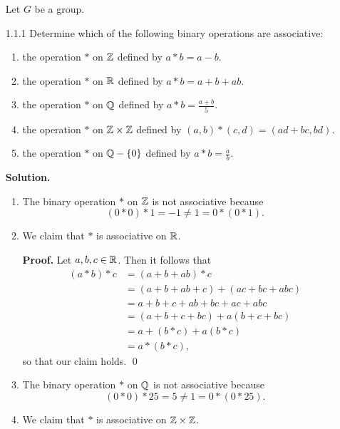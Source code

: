 \begin{enumerate}
   \item[]        Let $G$ be a group.
   \item[1.1.1]   Determine which of the following binary operations are
                  associative:
                  \begin{enumerate}
                     \item the operation $*$ on $\mathbb{Z}$ defined by $a * b = a - b$.
                     \item the operation $*$ on $\mathbb{R}$ defined by
                           $a * b = a + b + ab$.
                     \item the operation $*$ on $\mathbb{Q}$ defined by
                           $\displaystyle a * b = \frac{a + b}{5}$.
                     \item the operation $*$ on $\mathbb{Z} \times \mathbb{Z}$ defined by
                           $(a, b) * (c, d) = (ad + bc, bd)$.
                     \item the operation $*$ on $\mathbb{Q} - \{0\}$ defined by
                           $\displaystyle a * b = \frac{a}{b}$.
                  \end{enumerate}
                  
      \textbf{Solution.}
   
      \begin{enumerate}
         \item The binary operation $*$ on $\mathbb{Z}$ is not associative because
               $$(0 * 0) * 1 = -1 \neq 1 = 0 * (0 * 1).$$
         \item We claim that $*$ is associative on $\mathbb{R}$.
      
               \textbf{Proof.} Let $a, b, c \in \mathbb{R}$. Then it follows that
               \begin{align*}
                  (a * b) * c &= (a + b + ab) * c \\
                     &= (a + b + ab + c) + (ac + bc + abc) \\
                     &= a + b + c + ab + bc + ac + abc \\
                     &= (a + b + c + bc) + a(b + c + bc) \\
                     &= a + (b * c) + a(b * c) \\
                     &= a * (b * c),
               \end{align*}
               so that our claim holds. \qed
         \item The binary operation $*$ on $\mathbb{Q}$ is not associative because
               $$(0 * 0) * 25 = 5 \neq 1 = 0 * (0 * 25).$$
         \item We claim that $*$ is associative on $\mathbb{Z} \times \mathbb{Z}$.
      

\end{enumerate}
\end{enumerate}
